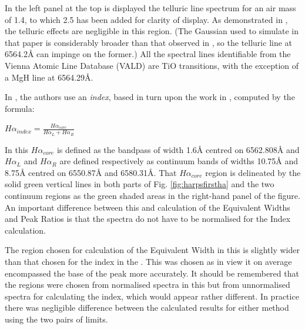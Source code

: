 In the left panel at the top is displayed the telluric line spectrum for an air mass of 1.4, to which 2.5 has been added
for clarity of display. As demonstrated in \citet[Fig. 1]{reiners15}, the telluric effects are negligible in this
region. (The Gaussian used to simulate {\ha} in that paper is considerably broader than that observed in \prox, so the
telluric line at 6564.2{\AA} can impinge on the former.) All the spectral lines identifiable from the Vienna Atomic Line
Database (VALD) are TiO transitions, with the exception of a MgH line at 6564.29\AA.


In \citet{suarezmascareno15}, the authors use an \textit{{\ha} index}, based in turn upon the work in
\citet{gomesdasilva11}, computed by the formula:

\begin{center}

$ H\alpha_{index} = \frac{H\alpha_{core}}{H\alpha_L + H\alpha_R} $

\end{center}

In this $ H\alpha_{core} $ is defined as the bandpass of width 1.6{\AA} centred on 6562.808{\AA} and $ H\alpha_L $ and
$H \alpha_R $ are defined respectively as continuum bands of widths 10.75{\AA} and 8.75{\AA} centred on 6550.87{\AA} and
6580.31\AA. That $ H\alpha_{core} $ region is delineated by the solid green vertical lines in both parts of
Fig. \ref{fig:harpsfirstha} and the two continuum regions as the green shaded areas in the right-hand panel of the
figure. An important difference between this and calculation of the Equivalent Widths and Peak Ratios is that the
spectra do not have to be normalised for the {\ha} Index calculation.

The region chosen for calculation of the {\ha} Equivalent Width in this {\paperorthesis} is slightly wider than that
chosen for the {\ha} index in the \citet{suarezmascareno15}. This was chosen as in {\Firstposs} view it on average
encompassed the base of the {\ha} peak more accurately. It should be remembered that the regions were chosen from
normalised spectra in this {\paperorthesis} but from unnormalised spectra for calculating the {\ha} index, which would
appear rather different. In practice there was negligible difference between the calculated results for either method
using the two pairs of limits.

